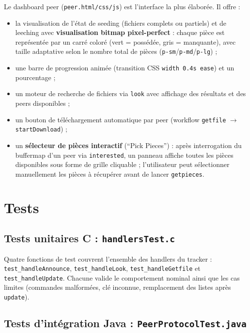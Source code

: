\documentclass[12pt,a4paper]{article}
\begin{document}
Le dashboard peer (\texttt{peer.html/css/js}) est l'interface la plus élaborée.
Il offre :

\begin{itemize}[leftmargin=1.2cm]
  \item la visualisation de l'état de seeding (fichiers complets ou partiels)
        et de leeching avec \textbf{visualisation bitmap pixel-perfect} : chaque
        pièce est représentée par un carré coloré (vert = possédée, gris =
        manquante), avec taille adaptative selon le nombre total de pièces
        (\texttt{p-sm}/\texttt{p-md}/\texttt{p-lg}) ;
  \item une barre de progression animée (transition CSS \texttt{width 0.4s ease})
        et un pourcentage ;
  \item un moteur de recherche de fichiers via \texttt{look} avec affichage des
        résultats et des peers disponibles ;
  \item un bouton de téléchargement automatique par peer (workflow
        \texttt{getfile} $\rightarrow$ \texttt{startDownload}) ;
  \item un \textbf{sélecteur de pièces interactif} (``Pick Pieces'') : après
        interrogation du buffermap d'un peer via \texttt{interested}, un panneau
        affiche toutes les pièces disponibles sous forme de grille cliquable ;
        l'utilisateur peut sélectionner manuellement les pièces à récupérer avant
        de lancer \texttt{getpieces}.
\end{itemize}

\section{Tests}

\subsection{Tests unitaires C : \texttt{handlersTest.c}}

Quatre fonctions de test couvrent l'ensemble des handlers du tracker :
\texttt{test\_handleAnnounce}, \texttt{test\_handleLook},
\texttt{test\_handleGetfile} et \texttt{test\_handleUpdate}.
Chacune valide le comportement nominal ainsi que les cas limites
(commandes malformées, clé inconnue, remplacement des listes après
\texttt{update}).

\subsection{Tests d'intégration Java : \texttt{PeerProtocolTest.java}}
\end{document}
